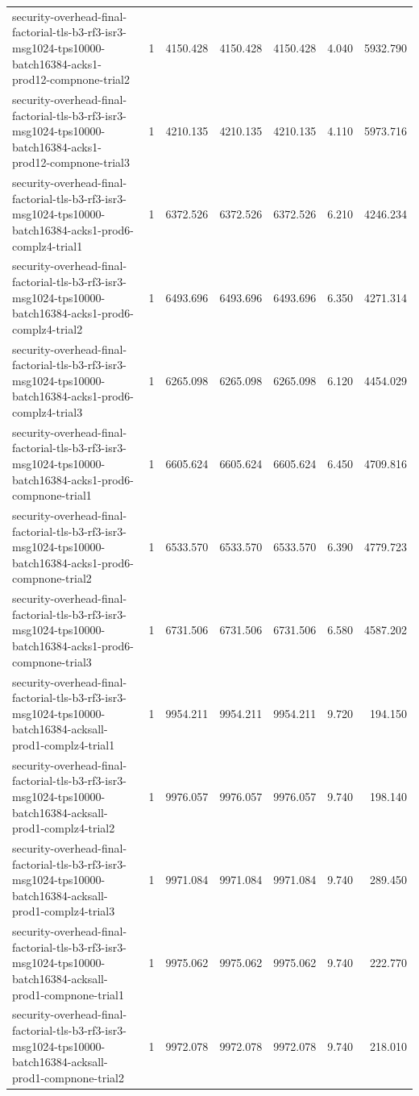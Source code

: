 \begin{tabular}{lrrrrrr}
security-overhead-final-factorial-tls-b3-rf3-isr3-msg1024-tps10000-batch16384-acks1-prod12-compnone-trial2 & 1 & 4150.428 & 4150.428 & 4150.428 & 4.040 & 5932.790 \\
security-overhead-final-factorial-tls-b3-rf3-isr3-msg1024-tps10000-batch16384-acks1-prod12-compnone-trial3 & 1 & 4210.135 & 4210.135 & 4210.135 & 4.110 & 5973.716 \\
security-overhead-final-factorial-tls-b3-rf3-isr3-msg1024-tps10000-batch16384-acks1-prod6-complz4-trial1 & 1 & 6372.526 & 6372.526 & 6372.526 & 6.210 & 4246.234 \\
security-overhead-final-factorial-tls-b3-rf3-isr3-msg1024-tps10000-batch16384-acks1-prod6-complz4-trial2 & 1 & 6493.696 & 6493.696 & 6493.696 & 6.350 & 4271.314 \\
security-overhead-final-factorial-tls-b3-rf3-isr3-msg1024-tps10000-batch16384-acks1-prod6-complz4-trial3 & 1 & 6265.098 & 6265.098 & 6265.098 & 6.120 & 4454.029 \\
security-overhead-final-factorial-tls-b3-rf3-isr3-msg1024-tps10000-batch16384-acks1-prod6-compnone-trial1 & 1 & 6605.624 & 6605.624 & 6605.624 & 6.450 & 4709.816 \\
security-overhead-final-factorial-tls-b3-rf3-isr3-msg1024-tps10000-batch16384-acks1-prod6-compnone-trial2 & 1 & 6533.570 & 6533.570 & 6533.570 & 6.390 & 4779.723 \\
security-overhead-final-factorial-tls-b3-rf3-isr3-msg1024-tps10000-batch16384-acks1-prod6-compnone-trial3 & 1 & 6731.506 & 6731.506 & 6731.506 & 6.580 & 4587.202 \\
security-overhead-final-factorial-tls-b3-rf3-isr3-msg1024-tps10000-batch16384-acksall-prod1-complz4-trial1 & 1 & 9954.211 & 9954.211 & 9954.211 & 9.720 & 194.150 \\
security-overhead-final-factorial-tls-b3-rf3-isr3-msg1024-tps10000-batch16384-acksall-prod1-complz4-trial2 & 1 & 9976.057 & 9976.057 & 9976.057 & 9.740 & 198.140 \\
security-overhead-final-factorial-tls-b3-rf3-isr3-msg1024-tps10000-batch16384-acksall-prod1-complz4-trial3 & 1 & 9971.084 & 9971.084 & 9971.084 & 9.740 & 289.450 \\
security-overhead-final-factorial-tls-b3-rf3-isr3-msg1024-tps10000-batch16384-acksall-prod1-compnone-trial1 & 1 & 9975.062 & 9975.062 & 9975.062 & 9.740 & 222.770 \\
security-overhead-final-factorial-tls-b3-rf3-isr3-msg1024-tps10000-batch16384-acksall-prod1-compnone-trial2 & 1 & 9972.078 & 9972.078 & 9972.078 & 9.740 & 218.010 \\

\end{tabular}
